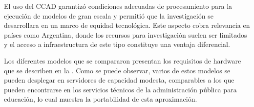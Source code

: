 El uso del CCAD garantizó condiciones adecuadas de procesamiento para la ejecución de modelos de gran escala y permitió que la investigación se desarrollara en un marco de equidad tecnológica. Este aspecto cobra relevancia en países como Argentina, donde los recursos para investigación suelen ser limitados y el acceso a infraestructura de este tipo constituye una ventaja diferencial.

Los diferentes modelos que se compararon presentan los requisitos de hardware que se describen en la . Como se puede observar, varios de estos modelos se pueden desplegar en servidores de capacidad modesta, comparables a los que pueden encontrarse en los servicios técnicos de la administración pública para educación, lo cual muestra la portabilidad de esta aproximación.

\begin{table}[H]
\caption{Requerimientos de memoria en GPU segun precisión fp32 y fp16 de los modelos}
\label{tab:modelos-peso}
\end{table}